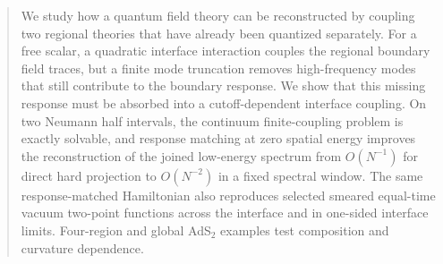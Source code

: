 \begin{abstract}

We study how a quantum field theory can be reconstructed by coupling two regional theories that have already been quantized separately. For a free scalar, a quadratic interface interaction couples the regional boundary field traces, but a finite mode truncation removes high-frequency modes that still contribute to the boundary response. We show that this missing response must be absorbed into a cutoff-dependent interface coupling. On two Neumann half intervals, the continuum finite-coupling problem is exactly solvable, and response matching at zero spatial energy improves the reconstruction of the joined low-energy spectrum from \(O(N^{-1})\) for direct hard projection to \(O(N^{-2})\) in a fixed spectral window. The same response-matched Hamiltonian also reproduces selected smeared equal-time vacuum two-point functions across the interface and in one-sided interface limits. Four-region and global AdS\(_2\) examples test composition and curvature dependence. 

\end{abstract}
